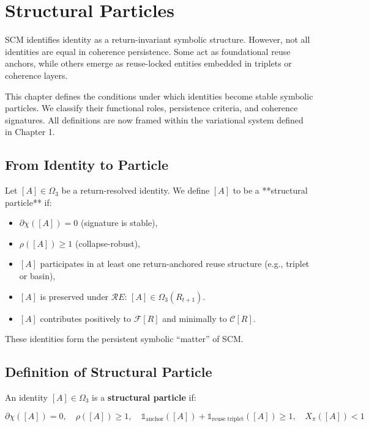 \chapter{Structural Particles} \label{chapter-structural-particles}

SCM identifies identity as a return-invariant symbolic structure. However, not all identities are equal in coherence persistence. Some act as foundational reuse anchors, while others emerge as reuse-locked entities embedded in triplets or coherence layers.

This chapter defines the conditions under which identities become stable symbolic particles. We classify their functional roles, persistence criteria, and coherence signatures. All definitions are now framed within the variational system defined in Chapter 1.

\section{From Identity to Particle} \label{sec:identity-to-particle}

Let $[A] \in \Omega_3$ be a return-resolved identity. We define $[A]$ to be a **structural particle** if:

\begin{itemize}
  \item $\partial\chi([A]) = 0$ (signature is stable),
  \item $\rho([A]) \geq 1$ (collapse-robust),
  \item $[A]$ participates in at least one return-anchored reuse structure (e.g., triplet or basin),
  \item $[A]$ is preserved under $\mathcal{R}E$: $[A] \in \Omega_3(R_{t+1})$.
  \item $[A]$ contributes positively to $\mathcal{F}[R]$ and minimally to $\mathcal{C}[R]$.
\end{itemize}

These identities form the persistent symbolic “matter” of SCM.

\section{Definition of Structural Particle} \label{sec:def-structural-particle}

\begin{definition}
An identity $[A] \in \Omega_3$ is a \textbf{structural particle} if:

\[
\partial\chi([A]) = 0,\quad
\rho([A]) \geq 1,\quad
\mathbb{1}_{\text{anchor}}([A]) + \mathbb{1}_{\text{reuse triplet}}([A]) \geq 1,\quad
X_\pi([A]) < 1
\]
\end{definition}

